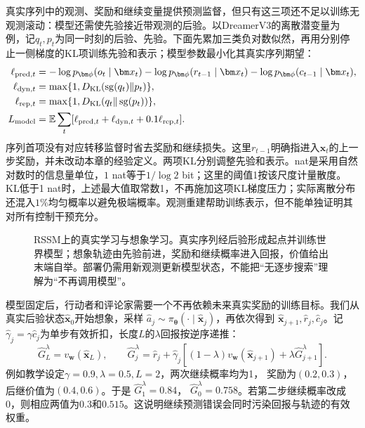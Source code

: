 真实序列中的观测、奖励和继续变量提供预测监督，但只有这三项还不足以训练无观测滚动：模型还需使先验接近带观测的后验。以DreamerV3的离散潜变量为例，记$q_t,p_t$为同一时刻的后验、先验。下面先累加三类负对数似然，再用分别停止一侧梯度的KL项训练先验和表示；模型参数最小化其真实序列期望：
\begin{align}
 \ell_{\mathrm{pred},t}
   &=-\log p_{\bm\phi}(o_t\mid\bm x_t)
     -\log p_{\bm\phi}(r_{t-1}\mid\bm x_t)
     -\log p_{\bm\phi}(c_{t-1}\mid\bm x_t),\notag\\
 \ell_{\mathrm{dyn},t}
   &=\max\{1,D_{\mathrm{KL}}(\operatorname{sg}(q_t)\|p_t)\},\notag\\
 \ell_{\mathrm{rep},t}
   &=\max\{1,D_{\mathrm{KL}}(q_t\|\operatorname{sg}(p_t))\},\notag\\
 L_{\mathrm{model}}&=\mathbb E\sum_t
       [\ell_{\mathrm{pred},t}+\ell_{\mathrm{dyn},t}
                         +0.1\ell_{\mathrm{rep},t}].
 \label{eq:rl-learning-dreamer-model}
\end{align}
序列首项没有对应转移监督时省去奖励和继续损失。这里$r_{t-1}$明确指进入$\bm x_t$的上一步奖励，并未改动本章的经验定义。两项KL分别调整先验和表示。nat是采用自然对数时的信息量单位，$1$ nat等于$1/\log2$ bit；这里的阈值1按该尺度计量散度。KL低于1 nat时，上述最大值取常数1，不再施加这项KL梯度压力；实际离散分布还混入$1\%$均匀概率以避免极端概率。观测重建帮助训练表示，但不能单独证明其对所有控制干预充分。

\begin{figure}[t]
  \centering
  
  \caption{RSSM上的真实学习与想象学习。真实序列经后验形成起点并训练世界模型；想象轨迹由先验前进，奖励和继续概率进入回报，价值给出末端自举。部署仍需用新观测更新模型状态，不能把“无逐步搜索”理解为“不再调用模型”。}
  \label{fig:rl-learning-dreamer}
\end{figure}

模型固定后，行动者和评论家需要一个不再依赖未来真实奖励的训练目标。我们从真实后验状态$\widehat{\bm x}_0$开始想象，采样
$\widehat a_j\sim\pi_{\bm\theta}(\cdot\mid\widehat{\bm x}_j)$，再依次得到
$\widehat{\bm x}_{j+1},\widehat r_j,\widehat c_j$。记
$\widehat\gamma_j=\gamma\widehat c_j$为单步有效折扣，长度$L$的$\lambda$回报按逆序递推：
\begin{equation}
 \widehat G_L^\lambda=v_{\bm w}(\widehat{\bm x}_L),\qquad
 \widehat G_j^\lambda
  =\widehat r_j+\widehat\gamma_j
     [(1-\lambda)v_{\bm w}(\widehat{\bm x}_{j+1})
                              +\lambda\widehat G_{j+1}^\lambda].
 \label{eq:rl-learning-dreamer-return}
\end{equation}
例如教学设定$\gamma=0.9,\lambda=0.5,L=2$，两次继续概率均为1，
奖励为$(0.2,0.3)$，后继价值为$(0.4,0.6)$。于是
$\widehat G_1^\lambda=0.84$，
$\widehat G_0^\lambda=0.758$。若第二步继续概率改成0，则相应两值为$0.3$和$0.515$。这说明继续预测错误会同时污染回报与轨迹的有效权重。


